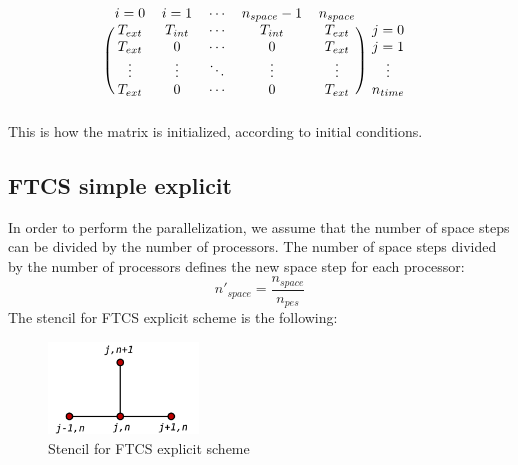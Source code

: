 \documentclass{article}
\begin{document}
            \[
                \begin{blockarray}{cccccc}
                i=0 & i=1 & \cdots & n_{space}-1 & n_{space} \\
                \begin{block}{(ccccc)c}
                  T_{ext} & T_{int} & \cdots & T_{int} & T_{ext} & j=0 \\
                  T_{ext} & 0 & \cdots & 0 & T_{ext} & j=1 \\
                  \vdots & \vdots & \ddots & \vdots & \vdots & \vdots \\
                  T_{ext} & 0 & \cdots & 0 & T_{ext} & n_{time} \\
                \end{block}
                \end{blockarray}
            \]
            This is how the matrix is initialized, according to initial conditions.

            \subsection{FTCS simple explicit}
                
            In order to perform the parallelization, we assume that the number of 
            space steps can be divided by the number of processors. The number of
            space steps divided by the number of processors defines the new space
            step for each processor:
            \begin{equation}
                n'_{space} = \frac{n_{space}}{n_{pes}}
            \end{equation}
            The stencil for FTCS explicit scheme is the following:
            \begin{figure}[H]
                \includegraphics[width=4cm]{stencil_explicit.png}
                \centering
                \caption{Stencil for FTCS explicit scheme}
            \end{figure}
\end{document}
